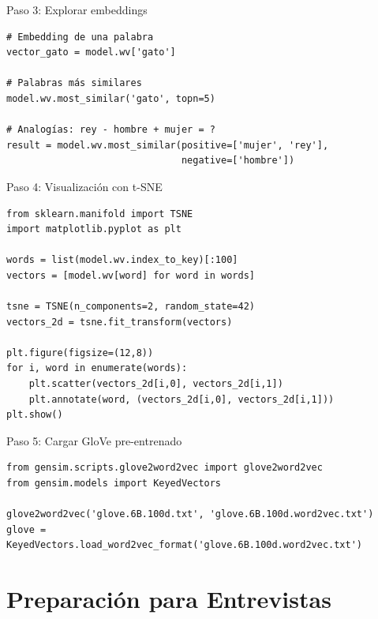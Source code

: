 \documentclass[aspectratio=169, 10pt, xcolor=table]{beamer}
\begin{document}
\begin{frame}[fragile]{Paso 3: Explorar embeddings}
    \begin{lstlisting}
# Embedding de una palabra
vector_gato = model.wv['gato']

# Palabras más similares
model.wv.most_similar('gato', topn=5)

# Analogías: rey - hombre + mujer = ?
result = model.wv.most_similar(positive=['mujer', 'rey'],
                               negative=['hombre'])
    \end{lstlisting}
\end{frame}

\begin{frame}[fragile]{Paso 4: Visualización con t-SNE}
    \begin{lstlisting}
from sklearn.manifold import TSNE
import matplotlib.pyplot as plt

words = list(model.wv.index_to_key)[:100]
vectors = [model.wv[word] for word in words]

tsne = TSNE(n_components=2, random_state=42)
vectors_2d = tsne.fit_transform(vectors)

plt.figure(figsize=(12,8))
for i, word in enumerate(words):
    plt.scatter(vectors_2d[i,0], vectors_2d[i,1])
    plt.annotate(word, (vectors_2d[i,0], vectors_2d[i,1]))
plt.show()
    \end{lstlisting}
\end{frame}

\begin{frame}[fragile]{Paso 5: Cargar GloVe pre-entrenado}
    \begin{lstlisting}
from gensim.scripts.glove2word2vec import glove2word2vec
from gensim.models import KeyedVectors

glove2word2vec('glove.6B.100d.txt', 'glove.6B.100d.word2vec.txt')
glove = KeyedVectors.load_word2vec_format('glove.6B.100d.word2vec.txt')
    \end{lstlisting}
\end{frame}

\section{Preparación para Entrevistas}
\end{document}
